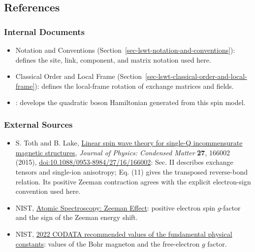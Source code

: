 \subsection{References}

\subsubsection{Internal Documents}

\begin{itemize}
\tightlist
\item
  Notation and Conventions (Section~\ref{sec-lswt-notation-and-conventions}): defines the site, link, component, and matrix notation used here.
\item
  Classical Order and Local Frame (Section~\ref{sec-lswt-classical-order-and-local-frame}): defines the local-frame rotation of exchange matrices and fields.
\item
  : develops the quadratic boson Hamiltonian generated from this spin model.
\end{itemize}

\subsubsection{External Sources}

\begin{itemize}
\tightlist
\item
  S. Toth and B. Lake, \href{https://arxiv.org/abs/1402.6069}{Linear spin wave theory for single-Q incommensurate magnetic structures}, \emph{Journal of Physics: Condensed Matter} \textbf{27}, 166002 (2015), \href{https://doi.org/10.1088/0953-8984/27/16/166002}{doi:10.1088/0953-8984/27/16/166002}: Sec. II describes exchange tensors and single-ion anisotropy; Eq. (11) gives the transposed reverse-bond relation. Its positive Zeeman contraction agrees with the explicit electron-sign convention used here.
\item
  NIST, \href{https://www.nist.gov/pml/atomic-spectroscopy-compendium-basic-ideas-notation-data-and-formulas/atomic-spectroscopy-zeeman}{Atomic Spectroscopy: Zeeman Effect}: positive electron spin \(g\)-factor and the sign of the Zeeman energy shift.
\item
  NIST, \href{https://physics.nist.gov/cuu/Constants/Table/allascii.txt}{2022 CODATA recommended values of the fundamental physical constants}: values of the Bohr magneton and the free-electron \(g\) factor.
\end{itemize}
